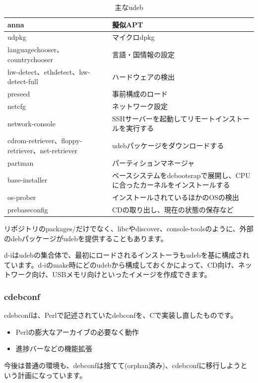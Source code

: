\documentclass[mingoth]{jsarticle}
\begin{document}
\begin{table}[htbp]
  \begin{tabular}[htbp]{|l|p{7cm}|}\hline
    anna&擬似APT\\ \hline
    udpkg&マイクロdpkg\\ \hline
    languagechooser、countrychooser&言語・国情報の設定\\ \hline
    hw-detect、ethdetect、hw-detect-full&ハードウェアの検出\\ \hline
    preseed&事前構成のロード\\ \hline
    netcfg&ネットワーク設定\\ \hline
    network-console&SSHサーバーを起動してリモートインストールを実行する\\ \hline
    cdrom-retriever、floppy-retriever、net-retriever&udebパッケージをダウンロードする\\ \hline
    partman&パーティションマネージャ\\ \hline
    base-installer&ベースシステムをdebootsrapで展開し、CPUに合ったカーネルをインストールする\\ \hline
    os-prober&インストールされているほかのOSの検出\\ \hline
    prebaseconfig&CDの取り出し、現在の状態の保存など\\ \hline
  \end{tabular}
  \caption{主なudeb}
  \label{tab:udeb}
\end{table}

リポジトリのpackages/だけでなく、libcやdiscover、console-toolsのように、外部のdebパッケージがudebを提供することもあります。

d-iはudebの集合体で、最初にロードされるインストーラもudebを基に構成されています。d-iのmake時にどのudebから構成しておくかによって、CD向け、ネットワーク向け、USBメモリ向けといったイメージを作成できます。


\subsubsection{cdebconf}
\label{sec:cdebconf}

cdebconfは、Perlで記述されていたdebconfを、Cで実装し直したものです。

\begin{itemize}
\item Perlの膨大なアーカイブの必要なく動作
\item 進捗バーなどの機能拡張
\end{itemize}

今後は普通の環境も、debconfは捨てて(orphan済み)、cdebconfに移行しようという計画になっています。
\end{document}
